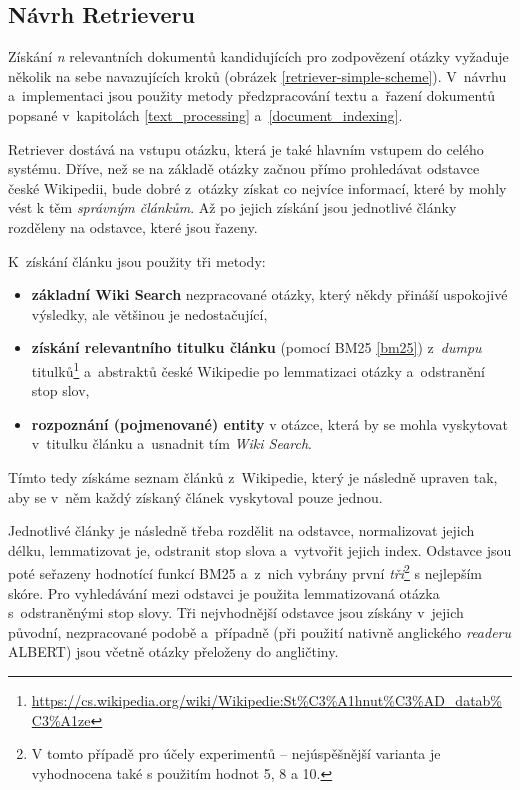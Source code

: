 \subsection{Návrh Retrieveru}
Získání \emph{n} relevantních dokumentů kandidujících pro zodpovězení otázky vyžaduje několik na sebe navazujících kroků (obrázek \ref{retriever-simple-scheme}). V~návrhu a~implementaci jsou použity metody předzpracování textu a~řazení dokumentů popsané v~kapitolách \ref{text_processing} a~\ref{document_indexing}.\par
Retriever dostává na vstupu otázku, která je také hlavním vstupem do celého systému. Dříve, než se na základě otázky začnou přímo prohledávat odstavce české Wikipedii, bude dobré z~otázky získat co nejvíce informací, které by mohly vést k těm \emph{správným článkům}. Až po jejich získání jsou jednotlivé články rozděleny na odstavce, které jsou řazeny.\par
\noindent K~získání článku jsou použity tři metody:
\begin{itemize}
    \item \textbf{základní Wiki Search} nezpracované otázky, který někdy přináší uspokojivé výsledky, ale většinou je nedostačující,
    \item \textbf{získání relevantního titulku článku} (pomocí BM25 \ref{bm25}) z~\emph{dumpu} titulků\footnote{\url{https://cs.wikipedia.org/wiki/Wikipedie:St\%C3\%A1hnut\%C3\%AD_datab\%C3\%A1ze}} a~abstraktů české Wikipedie po lemmatizaci otázky a~odstranění stop slov,
    \item \textbf{rozpoznání (pojmenované) entity} v otázce, která by se mohla vyskytovat v~titulku článku a~usnadnit tím \emph{Wiki Search}.
\end{itemize}
Tímto tedy získáme seznam článků z~Wikipedie, který je následně upraven tak, aby se v~něm každý získaný článek vyskytoval pouze jednou.\par
Jednotlivé články je následně třeba rozdělit na odstavce, normalizovat jejich délku, lemmatizovat je, odstranit stop slova a~vytvořit jejich index. Odstavce jsou poté seřazeny hodnotící funkcí BM25 a~z~nich vybrány první \textit{tři}\footnote{V tomto případě pro účely experimentů -- nejúspěšnější varianta je vyhodnocena také s použitím hodnot 5, 8 a 10.} s nejlepším skóre. Pro vyhledávání mezi odstavci je použita lemmatizovaná otázka s~odstraněnými stop slovy. Tři nejvhodnější odstavce jsou získány v~jejich původní, nezpracované podobě a~případně (při použití nativně anglického \emph{readeru} ALBERT) jsou včetně otázky přeloženy do angličtiny.


